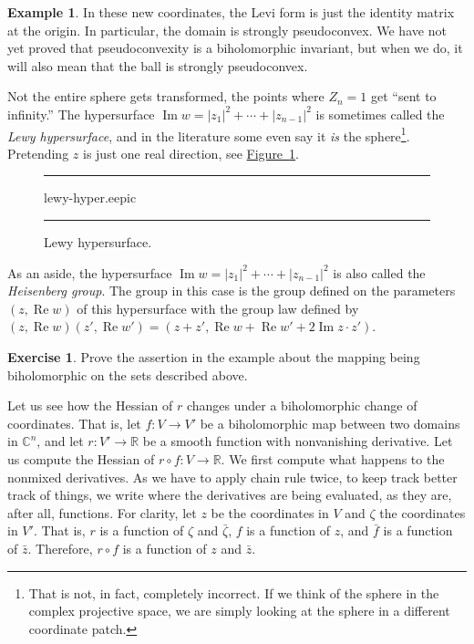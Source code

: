 \documentclass[12pt,openany]{book}
\renewcommand{\Re}{\operatorname{Re}}
\renewcommand{\Im}{\operatorname{Im}}
\newcommand{\sabs}[1]{\lvert {#1} \rvert}
\newcommand{\C}{{\mathbb{C}}}
\newcommand{\R}{{\mathbb{R}}}
\newcommand{\myindex}[1]{#1\index{#1}}
\theoremstyle{plain}
\theoremstyle{remark}
\theoremstyle{definition}
\newenvironment{exbox}{%
    \def\FrameCommand{\vrule width 1pt \relax\hspace{10pt}}%
    \MakeFramed{\advance\hsize-\width\FrameRestore}%
}{%
    \endMakeFramed
}
\newenvironment{myfig}{%
\begin{figure}[h!t]
\noindent\rule{\textwidth}{0.5pt}\vspace{12pt}\par\centering}%
{\par\noindent\rule{\textwidth}{0.5pt}
\end{figure}}
\theoremstyle{exercise}
\newtheorem{exercise}{Exercise}[section]
\theoremstyle{example}
\newtheorem{example}[thm]{Example}
\newcommand{\figureref}[1]{\hyperref[#1]{Figure~\ref*{#1}}}
\begin{document}
\begin{example}
In these new coordinates, the Levi form is just the identity matrix at the
origin.  In particular, the domain is strongly pseudoconvex.
We have not yet proved that pseudoconvexity is a biholomorphic invariant,
but when we do, it will also mean that the ball is strongly pseudoconvex.

Not the entire sphere gets transformed, the points where $Z_n=1$
get ``sent to infinity.''
The hypersurface $\Im w = \sabs{z_1}^2 + \cdots + \sabs{z_{n-1}}^2$
is sometimes called the \emph{\myindex{Lewy hypersurface}}, and in the
literature some even say it \emph{is} the sphere\footnote{That is not, in
fact, completely incorrect.
If we think of the sphere in the complex projective space,
we are simply looking at the sphere in a different coordinate patch.}.
Pretending $z$ is just one real direction, see \figureref{fig:lewy-hyper}.

\begin{myfig}
{lewy-hyper.eepic}
\caption{Lewy hypersurface.\label{fig:lewy-hyper}}
\end{myfig}

As an aside,
the hypersurface 
$\Im w = \sabs{z_1}^2 + \cdots + \sabs{z_{n-1}}^2$ is also called the
\emph{\myindex{Heisenberg group}}.  The group in this case
is the group defined on the parameters $(z,\Re w)$ of this hypersurface with the
group law defined by $(z,\Re w)(z',\Re w') =
(z+z',\Re w + \Re w' + 2 \Im z \cdot z')$.
\end{example}

\begin{exbox}
\begin{exercise}
Prove the assertion in the example about the mapping being biholomorphic
on the sets described above.
\end{exercise}
\end{exbox}

Let us see how the Hessian of $r$ changes under a biholomorphic change
of coordinates.  That is, let $f \colon V \to V'$ be a biholomorphic map
between two domains in $\C^n$, and let $r \colon V' \to \R$ be a smooth
function with nonvanishing derivative.  Let us compute the Hessian of
$r \circ f \colon V \to \R$.
We first compute what happens to the nonmixed derivatives.
As we have to apply chain rule twice, to keep track better track of things,
we write where the derivatives are being evaluated, as they are, after all,
functions.
For clarity, let $z$ be the coordinates in $V$
and $\zeta$ the coordinates in $V'$.
That is, $r$ is a function of $\zeta$ and $\bar{\zeta}$,
$f$ is a function of $z$, and $\bar{f}$ is a function of $\bar{z}$.
Therefore, $r \circ f$ is a function of $z$ and $\bar{z}$.
\end{document}
